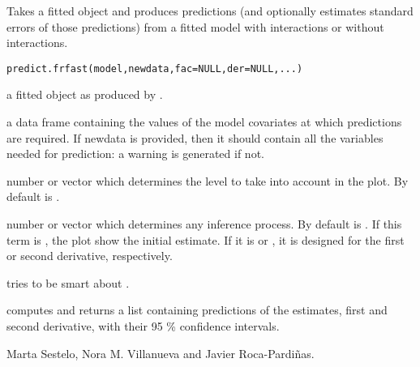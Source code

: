 %
\begin{Description}\relax
Takes a fitted  object  and produces predictions (and optionally estimates standard errors of those predictions) from a fitted model with interactions or without interactions.
\end{Description}
%
\begin{Usage}
\begin{verbatim}
predict.frfast(model,newdata,fac=NULL,der=NULL,...)
\end{verbatim}
\end{Usage}
%
\begin{Arguments}
\begin{ldescription}
\item[\code{model}] a fitted  object as produced by .

\item[\code{newdata}] a data frame containing the values of the model covariates at which predictions are required.  If newdata is provided, then it should contain all the variables needed for prediction: a warning is generated if not.

\item[\code{fac}] number or vector which determines the level to take into account in the plot. By default is .

\item[\code{der}] number or vector which determines any inference process. By default  is . If this term is , the plot show the initial estimate. If it is  or , it is designed for the first or second derivative, respectively.

\end{ldescription}
\end{Arguments}
%
\begin{Details}\relax
{} tries to be smart about .
\end{Details}
%
\begin{Value}
 computes and returns a list containing predictions of the estimates, first and second derivative, with their 95 \% confidence intervals. 
\end{Value}
%
\begin{Author}\relax
Marta Sestelo, Nora M. Villanueva and Javier Roca-Pardiñas.
\end{Author}
%
